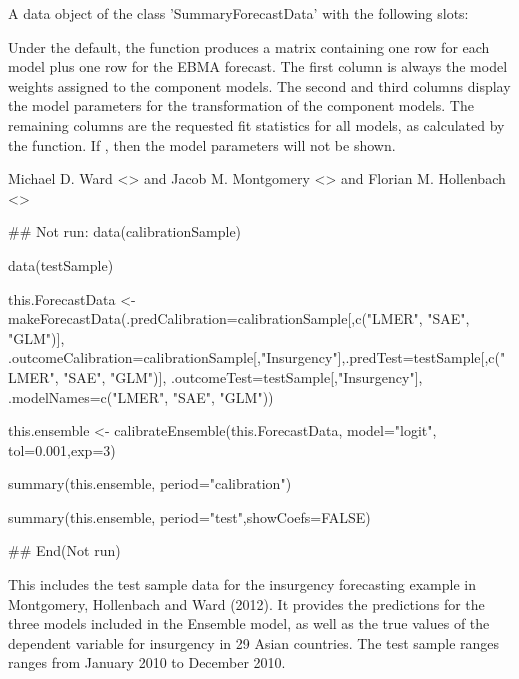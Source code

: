 \documentclass[a4paper]{book}
\begin{document}
%
\begin{Value}
A data object of the class 'SummaryForecastData' with the following slots:
\begin{ldescription}
\item[\code{summaryData}] Under the default, the function produces a matrix containing one row for each model plus one row for the EBMA forecast.  The first column is always the model weights assigned to the component models.  The second and third columns display the model parameters for the transformation of the component models.  The remaining columns are the requested fit statistics for all models, as calculated by the  function.  If , then the model parameters will not be shown.
\end{ldescription}
\end{Value}
%
\begin{Author}\relax
Michael D. Ward <> and Jacob M. Montgomery <> and Florian M. Hollenbach <>
\end{Author}
%
\begin{Examples}
\begin{ExampleCode}
## Not run:  data(calibrationSample)

data(testSample)

this.ForecastData <- makeForecastData(.predCalibration=calibrationSample[,c("LMER", "SAE", "GLM")],
.outcomeCalibration=calibrationSample[,"Insurgency"],.predTest=testSample[,c("LMER", "SAE", "GLM")],
.outcomeTest=testSample[,"Insurgency"], .modelNames=c("LMER", "SAE", "GLM"))

this.ensemble <- calibrateEnsemble(this.ForecastData, model="logit", tol=0.001,exp=3)

summary(this.ensemble, period="calibration")

summary(this.ensemble, period="test",showCoefs=FALSE)

## End(Not run)
\end{ExampleCode}
\end{Examples}
%
\begin{Description}\relax
This includes the test sample data for the insurgency forecasting example in Montgomery, Hollenbach and Ward (2012). It provides the predictions for the three models included in the Ensemble model, as well as the true values of the dependent variable for insurgency in 29 Asian countries. The test sample ranges ranges from January 2010 to December 2010.
\end{Description}
\end{document}
